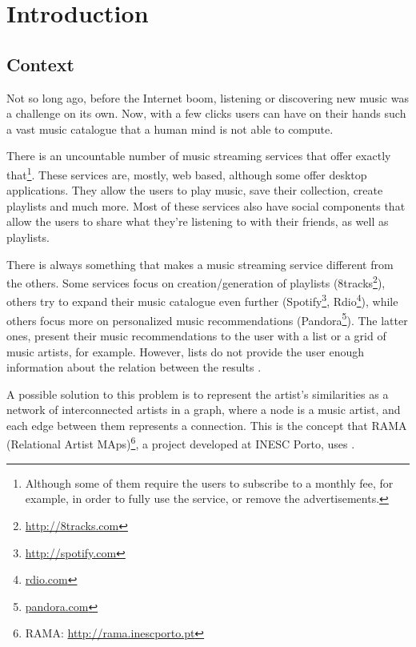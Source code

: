 
\chapter{Introduction} \label{chap:intro}


\section*{}

\section{Context} \label{sec:context}


  Not so long ago, before the Internet boom, listening or discovering new music was a challenge on its own.
  Now, with a few clicks users can have on their hands such a vast music catalogue that a human mind is not able to compute.

  There is an uncountable number of music streaming services that offer exactly that\footnote{Although some of them require the users to subscribe to a monthly fee, for example, in order to fully use the service, or remove the advertisements.}.
  These services are, mostly, web based, although some offer desktop applications.
  They allow the users to play music, save their collection, create playlists and much more.
  Most of these services also have social components that allow the users to share what they're listening to with their friends, as well as playlists.

  There is always something that makes a music streaming service different from the others.
  Some services focus on creation/generation of playlists (8tracks\footnote{\url{http://8tracks.com}}), others try to expand their music catalogue even further (Spotify\footnote{\url{http://spotify.com}}, Rdio\footnote{\url{rdio.com}}), while others focus more on personalized music recommendations (Pandora\footnote{\url{pandora.com}}).
  The latter ones, present their music recommendations to the user with a list or a grid of music artists, for example.
  However, lists do not provide the user enough information about the relation between the results \cite{Lamere2008}.

  A possible solution to this problem is to represent the artist's similarities as a network of interconnected artists in a graph, where a node is a music artist, and each edge between them represents a connection.
  This is the concept that RAMA (Relational Artist MAps)\footnote{RAMA: \url{http://rama.inescporto.pt}}, a project developed at INESC Porto, uses \cite{Costa2008} \cite{Sarmento2009} \cite{Costa2009} \cite{Gouyon2011}.

